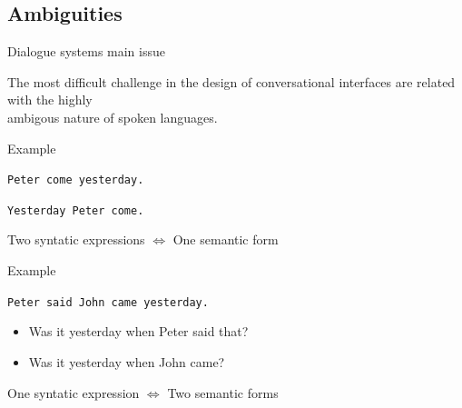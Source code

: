 \documentclass[11pt]{beamer}
\begin{document}
\subsection{Ambiguities}

\begin{frame}
	\begin{block}{Dialogue systems main issue}
		\begin{center}
		\vspace{10pt}
		The most difficult challenge in the design of conversational interfaces are related with the highly \\ambigous nature of spoken languages.
		\vspace{10pt}
		\end{center}
	\end{block}
	\pause	
	\begin{block}{Example}
		\begin{center}
		\vspace{10pt}
		\texttt{Peter come yesterday.}\par
		\texttt{Yesterday Peter come.}
		\vspace{10pt}
		\end{center}
	\end{block}
	\pause
	\begin{center}
		Two syntatic expressions $\Longleftrightarrow$ One semantic form
	\end{center}
\end{frame}

\begin{frame}
	\begin{block}{Example}
		\begin{center}
		\vspace{10pt}
		\texttt{Peter said John came yesterday.}
		\vspace{10pt}
		\end{center}
	\end{block}
	\vspace{10pt}
	\pause
	\begin{itemize}
		\item Was it yesterday when Peter said that?
		\item Was it yesterday when John came?
	\end{itemize}
	\vspace{10pt}
	\pause
	\begin{center}
		One syntatic expression $\Longleftrightarrow$ Two semantic forms
	\end{center}
\end{frame}
\end{document}
